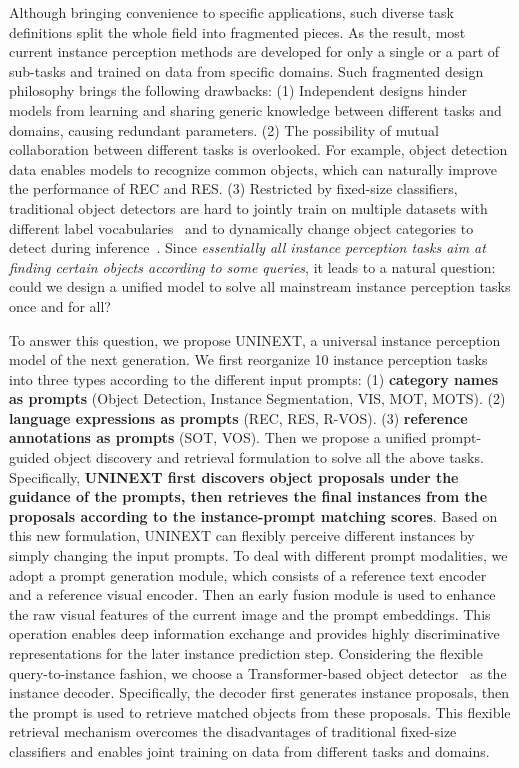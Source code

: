 \documentclass[10pt,twocolumn,letterpaper]{article}
\begin{document}
Although bringing convenience to specific applications, such diverse task definitions split the whole field into fragmented pieces. As the result, most current instance perception methods are developed for only a single or a part of sub-tasks and trained on data from specific domains. Such fragmented design philosophy brings the following drawbacks: (1) Independent designs hinder models from learning and sharing generic knowledge between different tasks and domains, causing redundant parameters.  (2) The possibility of mutual collaboration between different tasks is overlooked. For example, object detection data enables models to recognize common objects, which can naturally improve the performance of REC and RES. (3) Restricted by fixed-size classifiers, traditional object detectors are hard to jointly train on multiple datasets with different label vocabularies~\cite{COCO,LVIS,Objects365} and to dynamically change object categories to detect during inference~\cite{COCO,VIS,OVIS,BDD100K,MOT17,TAO}. Since \textit{essentially all instance perception tasks aim at finding certain objects according to some queries}, it leads to a natural question: could we design a unified model to solve all mainstream instance perception tasks once and for all?

To answer this question, we propose UNINEXT, a universal instance perception model of the next generation. We first reorganize 10 instance perception tasks into three types according to the different input prompts: (1) \textbf{category names as prompts} (Object Detection, Instance Segmentation, VIS, MOT, MOTS). (2) \textbf{language expressions as prompts} (REC, RES, R-VOS). (3) \textbf{reference annotations as prompts} (SOT, VOS). Then we propose a unified prompt-guided object discovery and retrieval formulation to solve all the above tasks. Specifically, \textbf{UNINEXT first discovers  object proposals under the guidance of the prompts, then retrieves the final instances from the proposals according to the instance-prompt matching scores}. Based on this new formulation, UNINEXT can flexibly perceive different instances by simply changing the input prompts. To deal with different prompt modalities, we adopt a prompt generation module, which consists of a reference text encoder and a reference visual encoder. Then an early fusion module is used to enhance the raw visual features of the current image and the prompt embeddings. This operation enables deep information exchange and provides highly discriminative representations for the later instance prediction step. Considering the flexible query-to-instance fashion, we choose a Transformer-based object detector~\cite{DeformableDETR} as the instance decoder. Specifically, the decoder first generates  instance proposals, then the prompt is used to retrieve matched objects from these proposals. This flexible retrieval mechanism overcomes the disadvantages of traditional fixed-size classifiers and enables joint training on data from different tasks and domains.
\end{document}
